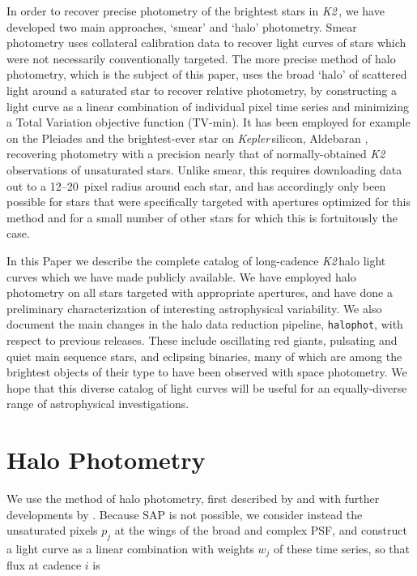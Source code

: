 \documentclass[twocolumn]{aastex62}
\newcommand\kepler{\emph{Kepler}\,}
\newcommand\ktwo{\emph{K2}\,}
\begin{document}
In order to recover precise photometry of the brightest stars in \ktwo, we have developed two main approaches, `smear' and `halo' photometry. Smear photometry \citep{Pope2016} uses collateral calibration data to recover light curves of stars which were not necessarily conventionally targeted. The more precise method of halo photometry, which is the subject of this paper, uses the broad `halo' of scattered light around a saturated star to recover relative photometry, by constructing a light curve as a linear combination of individual pixel time series and minimizing a Total Variation objective function (TV-min). It has been employed for example on the Pleiades \citep{White2017} and the brightest-ever star on \kepler silicon, Aldebaran \citep{Farr2018}, recovering photometry with a precision nearly that of normally-obtained \ktwo observations of unsaturated stars. Unlike smear, this requires downloading data out to a 12--20~pixel radius around each star, and has accordingly only been possible for stars that were specifically targeted with apertures optimized for this method and for a small number of other stars for which this is fortuitously the case.

In this Paper we describe the complete catalog of long-cadence \ktwo halo light curves which we have made publicly available. We have employed halo photometry on all stars targeted with appropriate apertures, and have done a preliminary characterization of interesting astrophysical variability. We also document the main changes in the halo data reduction pipeline, \texttt{halophot}, with respect to previous releases. These include oscillating red giants, pulsating and quiet main sequence stars, and eclipsing binaries, many of which are among the brightest objects of their type to have been observed with space photometry. We hope that this diverse catalog of light curves will be useful for an equally-diverse range of astrophysical investigations. 

\section{Halo Photometry}
\label{sec:k2}


We use the method of halo photometry, first described by \citet{White2017} and with further developments by \citet{Farr2018}. Because SAP is not possible, we consider instead the unsaturated pixels $p_j$ at the wings of the broad and complex PSF, and construct a light curve as a linear combination with weights $w_j$ of these time series, so that flux at cadence $i$ is 
\end{document}
